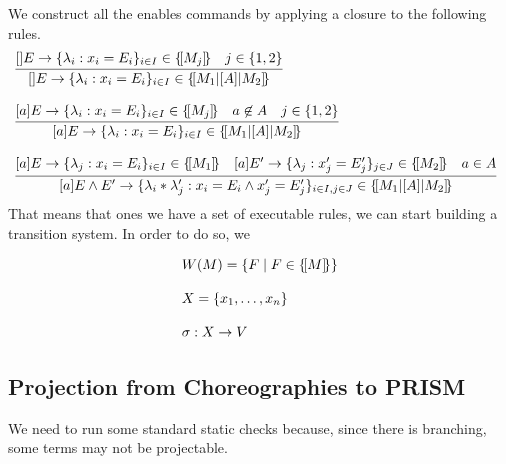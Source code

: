  We construct all the enables commands by applying a
closure to the following rules.
% 
\begin{displaymath}
  \begin{array}{lll}
    \infer[]
    {\cmd{}E{\lambda_i}{x_i}{E_i}{i\in I}\in \sem{M_1\ppp A M_2}}
    {\cmd{}E{\lambda_i}{x_i}{E_i}{i\in I}\in \sem{M_j}
    & j\in\{1,2\}}
    \\\\
    \infer[]
    {\cmd aE{\lambda_i}{x_i}{E_i}{i\in I}\in \sem{M_1\ppp A M_2}}
    {\cmd aE{\lambda_i}{x_i}{E_i}{i\in I}\in \sem{M_j}
    & a\not\in A    & j\in\{1,2\}}
    \\\\
    \infer[]
    {
    [a] E\land E' \rightarrow \{\lambda_i * \lambda_j': x_i = E_i \land x_j' = E_j' \}_{i\in I, j\in J}
    \in \sem{M_1\ppp A M_2}
    }
    {\cmd aE{\lambda_j}{x_i}{E_i}{i\in I}\in \sem{M_1}{}
    & \cmd a{E'}{\lambda_j}{x_j'}{E_j'}{j\in J}\in \sem{M_2}{}
    & a\in A}
  \end{array}
\end{displaymath}
That means that ones we have a set of executable rules, we can start
building a transition system. In order to do so, we


\begin{displaymath}
  \begin{array}{lll}
    W(M) = \{F \mid F\in\{\![M]\!\}\}
    \\\\
    X = \{x_1,\ldots,x_n\}
    \\\\
    \sigma : X \rightarrow V
  \end{array}
\end{displaymath}



\subsection{Projection from Choreographies to PRISM}
 We need to run some standard
static checks because, since there is branching, some terms may not be
projectable.


